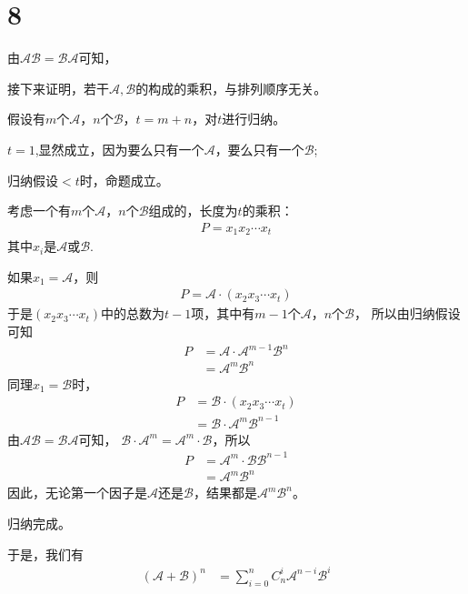 \documentclass{article}
\begin{document}
\section*{8}

由$\mathscr{A} \mathscr{B} = \mathscr{B} \mathscr{A}$可知，

接下来证明，若干$\mathscr{A}, \mathscr{B}$的构成的乘积，与排列顺序无关。

假设有$m$个$\mathscr{A}$，$n$个$\mathscr{B}$，$t = m + n$，对$t$进行归纳。

$t = 1$,显然成立，因为要么只有一个$\mathscr{A}$，要么只有一个$\mathscr{B}$;

归纳假设$< t$时，命题成立。

考虑一个有$m$个$\mathscr{A}$，$n$个$\mathscr{B}$组成的，长度为$t$的乘积：
\begin{align*}
  P = x_1 x_2 \cdots x_t
\end{align*}
其中$x_i$是$\mathscr{A}$或$\mathscr{B}$.

如果$x_1 = \mathscr{A}$，则
\begin{align*}
  P = \mathscr{A} \cdot (x_2 x_3 \cdots x_t)
\end{align*}
于是$(x_2 x_3 \cdots x_t)$中的总数为$t - 1$项，其中有$m - 1$个$\mathscr{A}$，$n$个$\mathscr{B}$，
所以由归纳假设可知
\begin{align*}
  P & = \mathscr{A} \cdot \mathscr{A}^{m - 1} \mathscr{B}^n \\
    & = \mathscr{A}^m \mathscr{B}^n
\end{align*}
同理$x_1 = \mathscr{B}$时，
\begin{align*}
  P & = \mathscr{B} \cdot (x_2 x_3 \cdots x_t)              \\
    & = \mathscr{B} \cdot \mathscr{A}^m \mathscr{B}^{n - 1}
\end{align*}
由$\mathscr{A} \mathscr{B} = \mathscr{B} \mathscr{A}$可知，
$\mathscr{B} \cdot \mathscr{A}^m = \mathscr{A}^m \cdot \mathscr{B}$，所以
\begin{align*}
  P & = \mathscr{A}^m \cdot \mathscr{B} \mathscr{B}^{n - 1} \\
    & = \mathscr{A}^m \mathscr{B}^{n}
\end{align*}
因此，无论第一个因子是$\mathscr{A}$还是$\mathscr{B}$，结果都是$\mathscr{A}^m \mathscr{B}^{n}$。

归纳完成。

于是，我们有
\begin{align*}
  (\mathscr{A} + \mathscr{B})^n
   & = \sum \limits_{i = 0}^n C_n^i \mathscr{A}^{n - i} \mathscr{B}^i
\end{align*}
\end{document}
